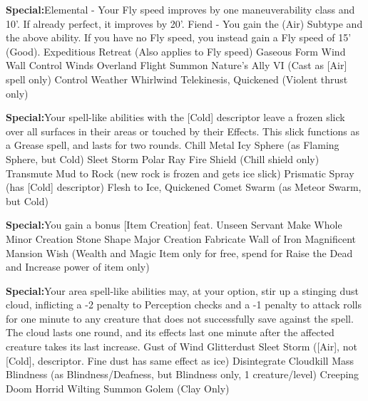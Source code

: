 \textbf{Special:}{Elemental - Your Fly speed improves by one maneuverability class and 10'. If already perfect, it improves by 20'. Fiend - You gain the (Air) Subtype and the above ability. If you have no Fly speed, you instead gain a Fly speed of 15' (Good).}
\sphere
{Expeditious Retreat (Also applies to Fly speed)}
{Gaseous Form}
{Wind Wall}
{Control Winds}
{Overland Flight}
{Summon Nature's Ally VI (Cast as [Air] spell only)}
{Control Weather}
{Whirlwind}
{Telekinesis, Quickened (Violent thrust only)}

\textbf{Special:}{Your spell-like abilities with the [Cold] descriptor leave a frozen slick over all surfaces in their areas or touched by their Effects. This slick functions as a Grease spell, and lasts for two rounds.}
\sphere
{Chill Metal}
{Icy Sphere (as Flaming Sphere, but Cold)}
{Sleet Storm}
{Polar Ray}
{Fire Shield (Chill shield only)}
{Transmute Mud to Rock (new rock is frozen and gets ice slick)}
{Prismatic Spray (has [Cold] descriptor)}
{Flesh to Ice, Quickened}
{Comet Swarm (as Meteor Swarm, but Cold)}


\textbf{Special:}{You gain a bonus [Item Creation] feat.}
\sphere
{Unseen Servant}
{Make Whole}
{Minor Creation}
{Stone Shape}
{Major Creation}
{Fabricate}
{Wall of Iron}
{Magnificent Mansion}
{Wish (Wealth and Magic Item only for free, spend for Raise the Dead and Increase power of item only)}


\textbf{Special:}{Your area spell-like abilities may, at your option, stir up a stinging dust cloud, inflicting a -2 penalty to Perception checks and a -1 penalty to attack rolls for one minute to any creature that does not successfully save against the spell. The cloud lasts one round, and its effects last one minute after the affected creature takes its last increase.}
\sphere
{Gust of Wind}
{Glitterdust}
{Sleet Storm ([Air], not [Cold], descriptor. Fine dust has same effect as ice)}
{Disintegrate}
{Cloudkill}
{Mass Blindness (as Blindness/Deafness, but Blindness only, 1 creature/level)}
{Creeping Doom}
{Horrid Wilting}
{Summon Golem (Clay Only)}

